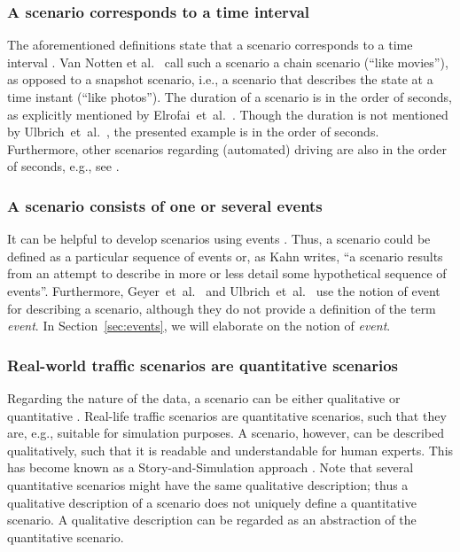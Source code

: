 \subsubsection{A scenario corresponds to a time interval}
The aforementioned definitions state that a scenario corresponds to a time interval \cite{go2004blind, geyer2014, ulbrich2015, elrofai2016scenario}. Van Notten et al.\ \cite{vannotten2003updated} call such a scenario a chain scenario (``like movies''), as opposed to a snapshot scenario, i.e., a scenario that describes the state at a time instant (``like photos''). The duration of a scenario is in the order of seconds, as explicitly mentioned by Elrofai~et~al.~\cite{elrofai2016scenario}. Though the duration is not mentioned by Ulbrich~et~al.~\cite{ulbrich2015}, the presented example is in the order of seconds. Furthermore, other scenarios regarding (automated) driving are also in the order of seconds, e.g., see \cite{gietelink2006development, zofka2015datadrivetrafficscenarios, roesener2017comprehensive, karaduman2013interactivebehavior, hulshof2013autonomous, englund2016grand}.

\subsubsection{A scenario consists of one or several events \cite{vannotten2003updated, go2004blind, geyer2014, ulbrich2015, kahn1962, englund2016grand, schoemaker1993multiple, cuppens2002alert, bach2016modelbased}}
It can be helpful to develop scenarios using events \cite{bishop2007scentechniques}. Thus, a scenario could be defined as a particular sequence of events or, as Kahn \cite{kahn1962} writes, ``a scenario results from an attempt to describe in more or less detail some hypothetical sequence of events''. Furthermore, Geyer~et~al.~\cite{geyer2014} and Ulbrich~et~al.~\cite{ulbrich2015} use the notion of event for describing a scenario, although they do not provide a definition of the term \emph{event}. In Section~\ref{sec:events}, we will elaborate on the notion of \emph{event}.

\subsubsection{Real-world traffic scenarios are quantitative scenarios}
Regarding the nature of the data, a scenario can be either qualitative or quantitative \cite{vannotten2003updated}. Real-life traffic scenarios are quantitative scenarios, such that they are, e.g., suitable for simulation purposes. A scenario, however, can be described qualitatively, such that it is readable and understandable for human experts. This has become known as a Story-and-Simulation approach \cite{alcamo2001scenarios}. Note that several quantitative scenarios might have the same qualitative description; thus a qualitative description of a scenario does not uniquely define a quantitative scenario. A qualitative description can be regarded as an abstraction of the quantitative scenario.
	
